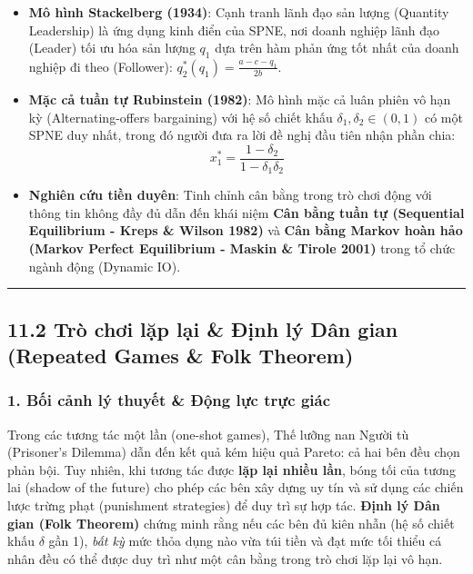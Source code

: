 \documentclass[
]{article}
\providecommand{\tightlist}{%
  \setlength{\itemsep}{0pt}\setlength{\parskip}{0pt}}
\begin{document}
\begin{itemize}
\tightlist
\item
  \textbf{Mô hình Stackelberg (1934)}: Cạnh tranh lãnh đạo sản lượng
  (Quantity Leadership) là ứng dụng kinh điển của SPNE, nơi doanh nghiệp
  lãnh đạo (Leader) tối ưu hóa sản lượng \(q_1\) dựa trên hàm phản ứng
  tốt nhất của doanh nghiệp đi theo (Follower):
  \(q_2^*(q_1) = \frac{a - c - q_1}{2b}\).
\item
  \textbf{Mặc cả tuần tự Rubinstein (1982)}: Mô hình mặc cả luân phiên
  vô hạn kỳ (Alternating-offers bargaining) với hệ số chiết khấu
  \(\delta_1, \delta_2 \in (0,1)\) có một SPNE duy nhất, trong đó người
  đưa ra lời đề nghị đầu tiên nhận phần chia:
  \[ x_1^* = \frac{1 - \delta_2}{1 - \delta_1 \delta_2} \]
\item
  \textbf{Nghiên cứu tiền duyên}: Tinh chỉnh cân bằng trong trò chơi
  động với thông tin không đầy đủ dẫn đến khái niệm \textbf{Cân bằng
  tuần tự (Sequential Equilibrium - Kreps \& Wilson 1982)} và
  \textbf{Cân bằng Markov hoàn hảo (Markov Perfect Equilibrium - Maskin
  \& Tirole 2001)} trong tổ chức ngành động (Dynamic IO).
\end{itemize}

\begin{center}\rule{0.5\linewidth}{0.5pt}\end{center}

\subsection{11.2 Trò chơi lặp lại \& Định lý Dân gian (Repeated Games \&
Folk
Theorem)}\label{truxf2-chux1a1i-lux1eb7p-lux1ea1i-ux111ux1ecbnh-luxfd-duxe2n-gian-repeated-games-folk-theorem}

\subsubsection{1. Bối cảnh lý thuyết \& Động lực trực
giác}\label{bux1ed1i-cux1ea3nh-luxfd-thuyux1ebft-ux111ux1ed9ng-lux1ef1c-trux1ef1c-giuxe1c-1}

Trong các tương tác một lần (one-shot games), Thế lưỡng nan Người tù
(Prisoner's Dilemma) dẫn đến kết quả kém hiệu quả Pareto: cả hai bên đều
chọn phản bội. Tuy nhiên, khi tương tác được \textbf{lặp lại nhiều lần},
bóng tối của tương lai (shadow of the future) cho phép các bên xây dựng
uy tín và sử dụng các chiến lược trừng phạt (punishment strategies) để
duy trì sự hợp tác. \textbf{Định lý Dân gian (Folk Theorem)} chứng minh
rằng nếu các bên đủ kiên nhẫn (hệ số chiết khấu \(\delta\) gần 1),
\emph{bất kỳ} mức thỏa dụng nào vừa túi tiền và đạt mức tối thiểu cá
nhân đều có thể được duy trì như một cân bằng trong trò chơi lặp lại vô
hạn.
\end{document}
